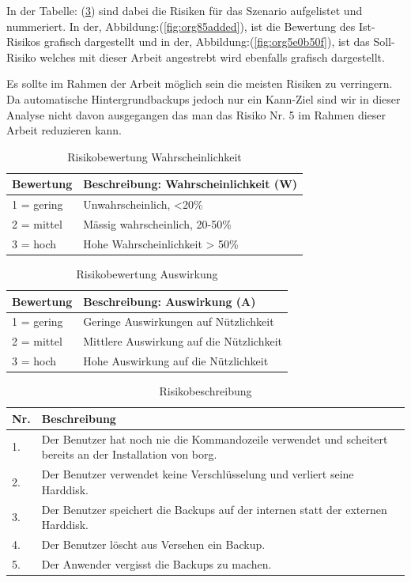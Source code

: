 In der Tabelle: (\ref{tab:org606c2c8}) sind dabei die Risiken für das
Szenario aufgelistet und nummeriert. In der, Abbildung:(\ref{fig:org85added}), ist die
Bewertung des Ist-Risikos grafisch dargestellt und in der,
Abbildung:(\ref{fig:org5e0b50f}), ist das Soll-Risiko welches mit dieser Arbeit
angestrebt wird ebenfalls grafisch dargestellt.

Es sollte im Rahmen der Arbeit möglich sein die meisten Risiken zu verringern.
Da automatische Hintergrundbackups jedoch nur ein Kann-Ziel sind wir in dieser
Analyse nicht davon ausgegangen das man das Risiko Nr. 5 im Rahmen dieser
Arbeit reduzieren kann.

\begin{table}[H]
\centering
\begin{tabular}{l|l}
\textbf{Bewertung} & \textbf{Beschreibung: Wahrscheinlichkeit (W)}\\
\hline
1 = gering & Unwahrscheinlich, <20\%\\
2 = mittel & Mässig wahrscheinlich, 20-50\%\\
3 = hoch & Hohe Wahrscheinlichkeit > 50\%\\
\end{tabular}
\caption{\label{tab:org826ea60}
Risikobewertung Wahrscheinlichkeit}

\end{table}

\begin{table}[H]
\centering
\begin{tabular}{l|l}
\textbf{Bewertung} & \textbf{Beschreibung: Auswirkung (A)}\\
\hline
1 = gering & Geringe Auswirkungen auf Nützlichkeit\\
2 = mittel & Mittlere Auswirkung auf die Nützlichkeit\\
3 = hoch & Hohe Auswirkung auf die Nützlichkeit\\
\end{tabular}
\caption{\label{tab:orgee0e694}
Risikobewertung Auswirkung}

\end{table}

\begin{table}[H]
\centering
\begin{tabular}{|>{\columncolor[HTML]{EFEFEF}}p{}|p{}|}
\hline
\textbf{Nr.}\cellcolor[HTML]{C0C0C0} & \textbf{Beschreibung}\cellcolor[HTML]{C0C0C0}\\
\hline
1. & Der Benutzer hat noch nie die Kommandozeile verwendet und scheitert bereits an der Installation von \gls{borg}.\\
\hline
2. & Der Benutzer verwendet keine Verschlüsselung und verliert seine Harddisk.\\
\hline
3. & Der Benutzer speichert die Backups auf der internen statt der externen Harddisk.\\
\hline
4. & Der Benutzer löscht aus Versehen ein Backup.\\
\hline
5. & Der Anwender vergisst die Backups zu machen.\\
\hline
\end{tabular}
\caption{\label{tab:org606c2c8}
Risikobeschreibung}

\end{table}

